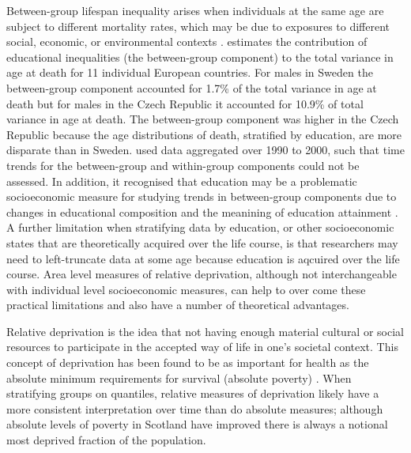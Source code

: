 \documentclass[12pt,oneside,a4paper]{article} %
\theoremstyle{definition}
\begin{document}
Between-group lifespan inequality arises when individuals at the same age are
subject to different mortality rates, which may be due to exposures to
different social, economic, or environmental contexts \citep{Hartemink2017}.
\citet{Raalte2012} estimates the contribution of educational inequalities (the
between-group component) to the total variance in age at death for 11 individual European countries. For males in Sweden the between-group component accounted for 1.7\% of the total variance in age at death but for males in the Czech Republic it accounted for 10.9\% of total variance in age at death. The between-group component was higher in the Czech Republic because the age distributions of death, stratified by education, are more disparate than in Sweden. 
\citet{Raalte2012} used data aggregated over 1990 to 2000, such
that time trends for the between-group and within-group components could not be assessed. 
In addition, it recognised that education may be a problematic socioeconomic
measure for studying trends in between-group components due to
changes in educational composition and the meanining of education attainment
\citep{Hendi2015}.
A further limitation when stratifying data by education, or other socioeconomic
states that are theoretically acquired over the life course, is that researchers
may need to left-truncate data at some age because education is aqcuired
over the life course. 
Area level measures of relative deprivation, although not interchangeable with individual level socioeconomic measures, can help to over come these practical limitations and also have a number of theoretical advantages.
 
Relative deprivation is the idea that not having enough material cultural
or social resources to participate in the accepted way of life in one's societal
context. This concept of deprivation has been found to be as important for
health as the absolute minimum requirements for survival (absolute poverty)
\citep{Townsend1987,Carstairs1989,Kearns2000,Kawachi2002}. When stratifying
groups on quantiles, relative measures of deprivation likely have a
more consistent interpretation over time than do absolute measures; although
absolute levels of poverty in Scotland have improved there is always a notional
most deprived fraction of the population. 
\end{document}
